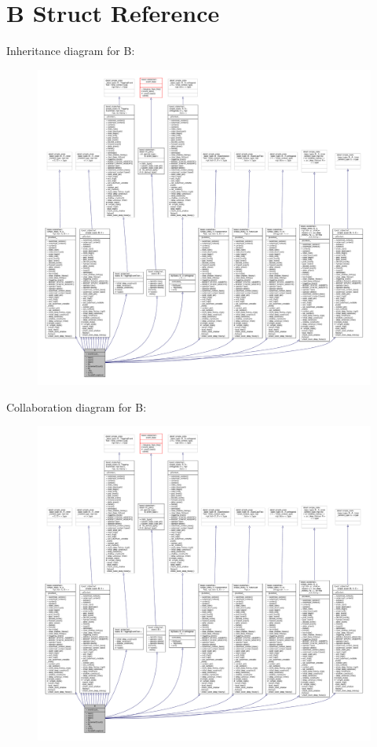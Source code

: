 \hypertarget{struct_b}{}\section{B Struct Reference}
\label{struct_b}


Inheritance diagram for B\+:
\nopagebreak
\begin{figure}[H]
\begin{center}
\leavevmode
\includegraphics[width=350pt]{struct_b__inherit__graph}
\end{center}
\end{figure}


Collaboration diagram for B\+:
\nopagebreak
\begin{figure}[H]
\begin{center}
\leavevmode
\includegraphics[width=350pt]{struct_b__coll__graph}
\end{center}
\end{figure}
